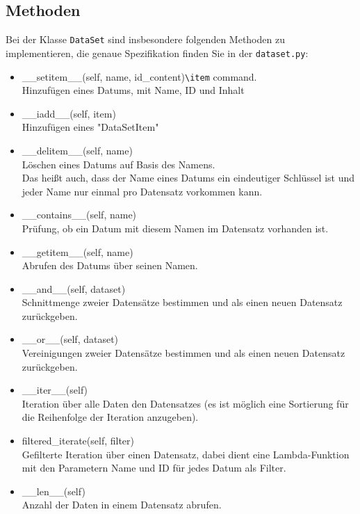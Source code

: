 \documentclass[
    12pt, %
    a4paper, %
    parskip=full, %
    ]{scrartcl}
\begin{document}
        \subsection{Methoden}
        Bei der Klasse \texttt{DataSet} sind insbesondere folgenden Methoden zu implementieren, die genaue Spezifikation finden Sie in der \texttt{dataset.py}:\\
        \begin{itemize}
             \item \_\_setitem\_\_(self, name, id\_content)\verb|\item| command.\\
             Hinzufügen eines Datums, mit Name, ID und Inhalt
            \item \_\_iadd\_\_(self, item)\\
            Hinzufügen eines "DataSetItem"
            \item \_\_delitem\_\_(self, name)\\
            Löschen eines Datums auf Basis des Namens.\\
            Das heißt auch, dass der Name eines Datums ein eindeutiger Schlüssel ist und jeder Name nur einmal pro Datensatz vorkommen kann.
            \item \_\_contains\_\_(self, name)\\
            Prüfung, ob ein Datum mit diesem Namen im Datensatz vorhanden ist.
            \item \_\_getitem\_\_(self, name)\\
            Abrufen des Datums über seinen Namen.
            \item \_\_and\_\_(self, dataset)\\
            Schnittmenge zweier Datensätze bestimmen und als einen neuen Datensatz zurückgeben.
            \item \_\_or\_\_(self, dataset)\\
            Vereinigungen zweier Datensätze bestimmen und als einen neuen Datensatz zurückgeben.
            \item \_\_iter\_\_(self)\\
            Iteration über alle Daten den Datensatzes (es ist möglich eine Sortierung für die Reihenfolge der Iteration anzugeben).
            \item filtered\_iterate(self, filter)\\
            Gefilterte Iteration über einen Datensatz, dabei dient eine Lambda-Funktion mit den Parametern Name und ID für jedes Datum als Filter.
            \item \_\_len\_\_(self)\\
            Anzahl der Daten in einem Datensatz abrufen.
            
        \end{itemize}
        
\end{document}
